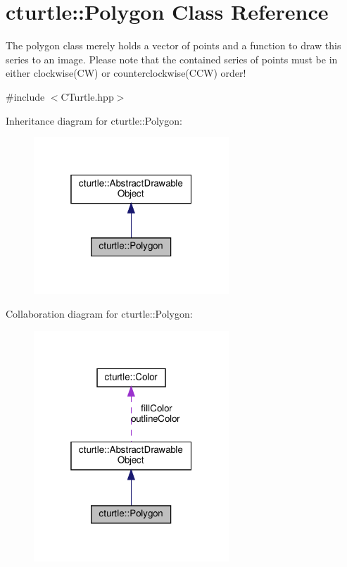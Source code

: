 \hypertarget{classcturtle_1_1Polygon}{}\section{cturtle\+:\+:Polygon Class Reference}
\label{classcturtle_1_1Polygon}


The polygon class merely holds a vector of points and a function to draw this series to an image. Please note that the contained series of points must be in either clockwise(\+C\+W) or counterclockwise(\+C\+C\+W) order!  




{\ttfamily \#include $<$C\+Turtle.\+hpp$>$}



Inheritance diagram for cturtle\+:\+:Polygon\+:\nopagebreak
\begin{figure}[H]
\begin{center}
\leavevmode
\includegraphics[width=208pt]{classcturtle_1_1Polygon__inherit__graph}
\end{center}
\end{figure}


Collaboration diagram for cturtle\+:\+:Polygon\+:\nopagebreak
\begin{figure}[H]
\begin{center}
\leavevmode
\includegraphics[width=208pt]{classcturtle_1_1Polygon__coll__graph}
\end{center}
\end{figure}
